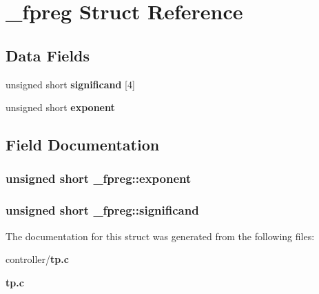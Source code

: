 \section{\_\-fpreg Struct Reference}
\label{struct__fpreg}
\subsection*{Data Fields}
\begin{DoxyCompactItemize}
\item 
unsigned short {\bf significand} [4]
\item 
unsigned short {\bf exponent}
\end{DoxyCompactItemize}


\subsection{Field Documentation}
\subsubsection[{exponent}]{\setlength{\rightskip}{0pt plus 5cm}unsigned short {\bf \_\-fpreg::exponent}}\label{struct__fpreg_aac80d1876f354d02fcedfcab6bf33762}
\subsubsection[{significand}]{\setlength{\rightskip}{0pt plus 5cm}unsigned short {\bf \_\-fpreg::significand}}\label{struct__fpreg_ac7b5add6e7a8f3327566659dab881f58}


The documentation for this struct was generated from the following files:\begin{DoxyCompactItemize}
\item 
controller/{\bf tp.c}\item 
{\bf tp.c}\end{DoxyCompactItemize}
